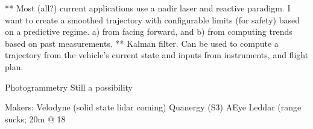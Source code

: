 \documentclass[10pt,a4paper]{report}
\begin{document}
** Most (all?) current applications use a nadir laser and reactive paradigm. I want to create a smoothed trajectory with configurable limits (for safety) based on a predictive regime. a) from facing forward, and b) from computing trends based on past measurements.
** Kalman filter. Can be used to compute a trajectory from the vehicle’s current state and inputs from instruments, and flight plan. 



Photogrammetry
Still a possibility

Makers:
Velodyne (solid state lidar coming)
Quanergy (S3)
AEye
Leddar (range sucks; 20m @ 18%



\end{document}
